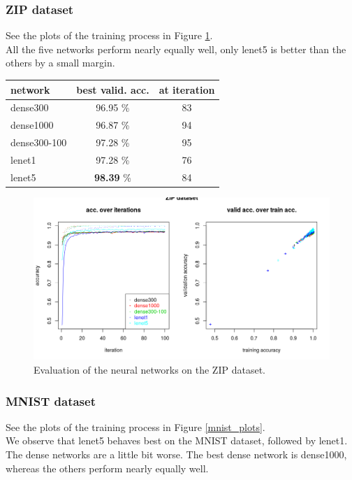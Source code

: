 \subsubsection{ZIP dataset}

See the plots of the training process in Figure \ref{zip_plots}.\\
All the five networks perform nearly equally well, only lenet5 is better than the others by a small margin.

\begin{tabular}{|l|c|c|}
 \hline
 network & best valid. acc. & at iteration\\ \hline
 dense300 & 96.95 \% & 83\\
 dense1000 & 96.87 \% & 94\\
 dense300-100 & 97.28 \% & 95\\
 lenet1 & 97.28 \% & 76\\
 lenet5 & \textbf{98.39} \% & 84\\
 \hline
\end{tabular}

\begin{figure}
 \includegraphics[width=\textwidth]{../plots/nn_zip}
 \caption{Evaluation of the neural networks on the ZIP dataset.}
 \label{zip_plots}
\end{figure}


\subsubsection{MNIST dataset}

See the plots of the training process in Figure \ref{mnist_plots}.\\
We observe that lenet5 behaves best on the MNIST dataset,
followed by lenet1.\\
The dense networks are a little bit worse.
The best dense network is dense1000, whereas the others perform nearly equally well.

